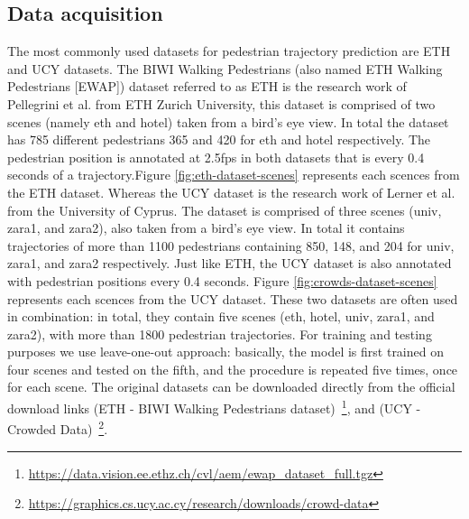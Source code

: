 \subsection{Data acquisition}
The most commonly used datasets for pedestrian trajectory prediction are ETH and UCY datasets.
The BIWI Walking Pedestrians (also named ETH Walking Pedestrians [EWAP]) dataset referred to as ETH \cite[]{ETH-biwi} is the research work of Pellegrini et al. from ETH Zurich University, this dataset is comprised of two scenes (namely eth and hotel) taken from a bird's eye view. In total the dataset has 785 different pedestrians 365 and 420 for eth and hotel respectively. The pedestrian position is annotated at 2.5fps in both datasets that is every 0.4 seconds of a trajectory.Figure \ref{fig:eth-dataset-scenes} represents each scences from the ETH dataset.\newline
Whereas the UCY dataset \cite[]{UCY-crowds} is the research work of Lerner et al. from the University of Cyprus. The dataset is comprised of three scenes (univ, zara1, and zara2), also taken from a bird's eye view. In total it contains trajectories of more than 1100 pedestrians containing 850, 148, and 204 for univ, zara1, and zara2 respectively. Just like ETH, the UCY dataset is also annotated with pedestrian positions every 0.4 seconds. Figure \ref{fig:crowds-dataset-scenes} represents each scences from the UCY dataset.\newline
These two datasets are often used in combination: in total, they contain five scenes (eth, hotel, univ, zara1, and zara2), with more than 1800 pedestrian trajectories. For training and testing purposes we use leave-one-out approach: basically, the model is first trained on four scenes and tested on the fifth, and the procedure is repeated five times, once for each scene.\newline 
The original datasets can be downloaded directly from the official download links (ETH - BIWI Walking Pedestrians dataset)~\footnote{\label{fn:eth-dataset}\url{https://data.vision.ee.ethz.ch/cvl/aem/ewap_dataset_full.tgz}}, and (UCY - Crowded Data)~\footnote{\label{fn:ucy-dataset}\url{https://graphics.cs.ucy.ac.cy/research/downloads/crowd-data}}.

